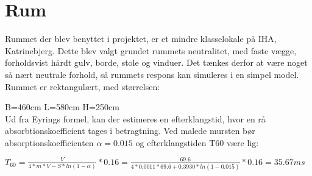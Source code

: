 \section{Rum}

Rummet der blev benyttet i projektet, er et mindre klasselokale på IHA, Katrinebjerg. 
Dette blev valgt grundet rummets neutralitet, med faste vægge, forholdsvist hårdt gulv, borde, stole og vinduer. Det tænkes derfor at være noget så nært neutrale forhold, så rummets respons kan simuleres i en simpel model. \\

Rummet er rektangulært, med størrelsen:

B=460cm \hspace{3cm}
L=580cm \hspace{3cm}
H=250cm\\

Ud fra Eyrings formel, kan der estimeres en efterklangstid, hvor en rå absorbtionskoefficient tages i betragtning. 
Ved malede mursten bør absorptionskoefficienten $\alpha=0.015$ \cite{Attenuation} og efterklangstiden T60 være lig:

\(T_{60}=\frac{V}{4*m*V-S*ln(1-\alpha)}*0.16=\frac{69.6}{4*0.0011* 69.6+0.3930*ln(1-0.015)}*0.16=35.67 ms\)

